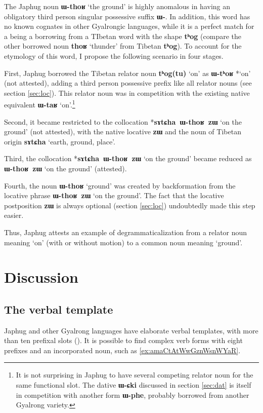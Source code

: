 \documentclass[oldfontcommands,oneside,a4paper,11pt]{article}
\newcommand{\ipa}[1]{\mbox{\phon\textbf{#1}}} %
\begin{document}
The Japhug noun \ipa{ɯ-thoʁ} `the ground' is highly anomalous in having an obligatory third person singular possessive suffix \ipa{ɯ-}. In addition, this word has no known cognates in other Gyalrongic languages, while it is a perfect match for a being a borrowing from a TIbetan word with the shape \ipa{tʰog} (compare the other borrowed noun \ipa{thoʁ} `thunder' from Tibetan \ipa{tʰog}). To account for the etymology of this word, I propose the following scenario in four stages.

First, Japhug borrowed the Tibetan relator noun  \ipa{tʰog(tu)} `on' as \ipa{ɯ-tʰoʁ} *`on' (not attested), adding a third person possessive prefix like all relator nouns (see section \ref{sec:loc}). This relator noun was in competition with the existing native equivalent \ipa{ɯ-taʁ} `on'.\footnote{It is not surprising in Japhug to have several competing relator noun for the same functional slot. The dative \ipa{ɯ-ɕki} discussed in section \ref{sec:dat} is itself in competition with another form \ipa{ɯ-phe}, probably borrowed from another Gyalrong variety.  }
  
  Second, it  became restricted to the collocation *\ipa{sɤtɕha ɯ-thoʁ zɯ} `on the ground' (not attested), with the native locative \ipa{zɯ} and the  noun of Tibetan origin \ipa{sɤtɕha} `earth, ground, place'.
  
    Third, the collocation *\ipa{sɤtɕha ɯ-thoʁ zɯ} `on the ground' became reduced as \ipa{ɯ-thoʁ zɯ} `on the ground' (attested).
 
 Fourth, the noun \ipa{ɯ-thoʁ} `ground' was created by backformation from the locative phrase \ipa{ɯ-thoʁ zɯ} `on the ground'. The fact that the locative postposition \ipa{zɯ} is always optional (section \ref{sec:loc}) undoubtedly made this step easier.
 
 Thus, Japhug attests an example of degrammaticalization from a relator noun meaning `on' (with or without motion) to a common noun meaning `ground'.
 
    \section{Discussion} 



\subsection{The verbal template} \label{sec:template}
 Japhug and other Gyalrong languages have elaborate verbal templates, with more than ten prefixal slots (\citealt{jacques13harmonization}). It is possible to find complex verb forms with eight prefixes and an incorporated noun, such as \ref{ex:amaCtAtWwGznWsnWYaR}.
 
\end{document}
